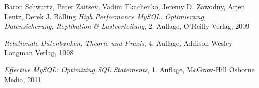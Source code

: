 \newpage
{}


  \begin{thebibliography}{}
  


     Baron Schwartz, Peter Zaitsev, Vadim Tkachenko, Jeremy D. Zawodny, Arjen Lentz, Derek J. Balling
      {\it High Performance MySQL. Optimierung, Datensicherung, Replikation & Lastverteilung}, 2. Auflage,  O'Reilly Verlag, 2009
      
     {\it Relationale Datenbanken, Theorie und Praxis}, 4. Auflage, Addison Wesley Longman Verlag, 1998
    
     {\it Effective MySQL: Optimizing SQL Statements}, 1. Auflage, McGraw-Hill Osborne Media, 2011
      
  \end{thebibliography}
  
  
 